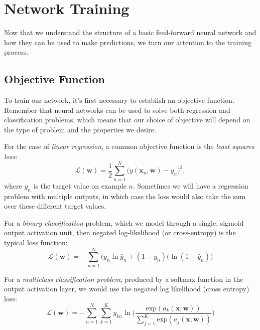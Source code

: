 
\section{Network Training}
Now that we understand the structure of a basic feed-forward neural network and how they can be used to make predictions, we turn our attention to the training process.

\subsection{Objective Function}

To train our network, it's first necessary to establish an objective function. Remember that neural networks can be used to solve both regression and classification problems, which means that our choice of objective will depend on the type of problem and the properties we desire.

For the case of {\em linear regression}, a common objective function is the {\em least squares loss}:
%
\begin{equation} \label{least-squares-loss-function}
	\mathcal{L}(\textbf{w}) = \frac{1}{2} \sum_{n=1}^{N} \bigg(y(\textbf{x}_{n}, \textbf{w}) - y_n\bigg)^{2},
      \end{equation}
      where $y_n$ is the target value on example $n$. Sometimes we will have a regression problem with multiple outputs, in which case the loss would also take the sum over these different target values.
      
      For a {\em binary classification} problem, which we model through a single, sigmoid output activation unit,
     then  negated log-likelihood (or cross-entropy) is the typical  loss function:
\begin{equation} \label{cross-entropy-loss-function}
	\mathcal{L}(\textbf{w}) = - \sum_{n=1}^{N} \bigg(y_{n}\ln{\hat{y}_{n}} + (1 - y_{n})(\ln{(1 - \hat{y}_{n})}\bigg)
      \end{equation}
      
      For a {\em multiclass classification problem}, produced by a softmax function in the output activation layer, we
      would use the negated log likelihood (cross entropy) loss:
\begin{equation} \label{multiclass-cross-entropy-loss-function}
	\mathcal{L}(\textbf{w}) = - \sum_{n=1}^{N} \sum_{k=1}^{K} y_{kn} \ln{\bigg(\frac{\text{exp}(a_{k}(\textbf{x}, \textbf{w}))}{\sum_{j=1}^{K}\text{exp}(a_{j}(\textbf{x}, \textbf{w}))}\bigg)}
\end{equation}

